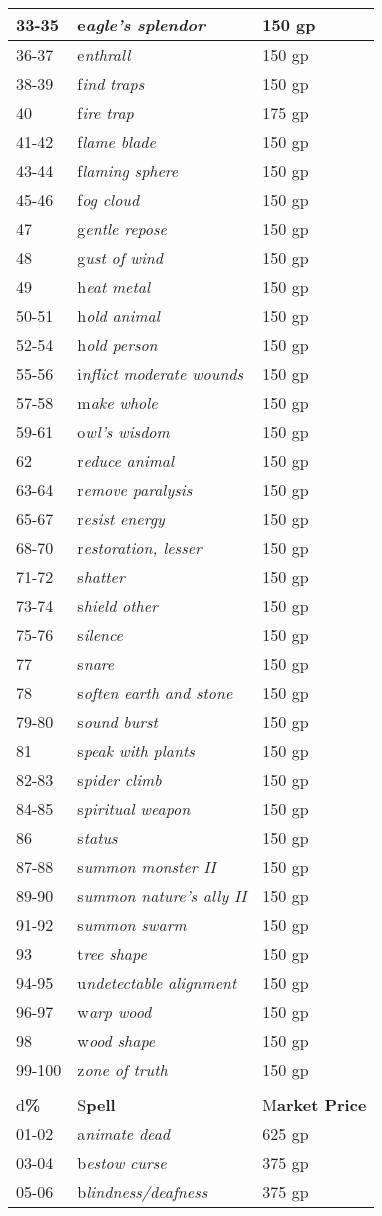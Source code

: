 \documentclass{article}
\begin{document}
\begin{tabular}{|>{\raggedright}p{29pt}|>{\raggedright}p{138pt}|>{\raggedright}p{147pt}|}
\hline
33-35 & e\textit{agle's splendor} & 150 gp\tabularnewline
\hline
36-37 & e\textit{nthrall} & 150 gp\tabularnewline
\hline
38-39 & f\textit{ind traps} & 150 gp\tabularnewline
\hline
40 & f\textit{ire trap} & 175 gp\tabularnewline
\hline
41-42 & f\textit{lame blade} & 150 gp\tabularnewline
\hline
43-44 & f\textit{laming sphere} & 150 gp\tabularnewline
\hline
45-46 & f\textit{og cloud} & 150 gp\tabularnewline
\hline
47 & g\textit{entle repose} & 150 gp\tabularnewline
\hline
48 & g\textit{ust of wind} & 150 gp\tabularnewline
\hline
49 & h\textit{eat metal} & 150 gp\tabularnewline
\hline
50-51 & h\textit{old animal} & 150 gp\tabularnewline
\hline
52-54 & h\textit{old person} & 150 gp\tabularnewline
\hline
55-56 & i\textit{nflict moderate wounds} & 150 gp\tabularnewline
\hline
57-58 & m\textit{ake whole} & 150 gp\tabularnewline
\hline
59-61 & o\textit{wl's wisdom} & 150 gp\tabularnewline
\hline
62 & r\textit{educe animal} & 150 gp\tabularnewline
\hline
63-64 & r\textit{emove paralysis} & 150 gp\tabularnewline
\hline
65-67 & r\textit{esist energy} & 150 gp\tabularnewline
\hline
68-70 & r\textit{estoration, lesser} & 150 gp\tabularnewline
\hline
71-72 & s\textit{hatter} & 150 gp\tabularnewline
\hline
73-74 & s\textit{hield other} & 150 gp\tabularnewline
\hline
75-76 & s\textit{ilence} & 150 gp\tabularnewline
\hline
77 & s\textit{nare} & 150 gp\tabularnewline
\hline
78 & s\textit{often earth and stone} & 150 gp\tabularnewline
\hline
79-80 & s\textit{ound burst} & 150 gp\tabularnewline
\hline
81 & s\textit{peak with plants} & 150 gp\tabularnewline
\hline
82-83 & s\textit{pider climb} & 150 gp\tabularnewline
\hline
84-85 & s\textit{piritual weapon} & 150 gp\tabularnewline
\hline
86 & s\textit{tatus} & 150 gp\tabularnewline
\hline
87-88 & s\textit{ummon monster II} & 150 gp\tabularnewline
\hline
89-90 & s\textit{ummon nature's ally II} & 150 gp\tabularnewline
\hline
91-92 & s\textit{ummon swarm} & 150 gp\tabularnewline
\hline
93 & t\textit{ree shape} & 150 gp\tabularnewline
\hline
94-95 & u\textit{ndetectable alignment} & 150 gp\tabularnewline
\hline
96-97 & w\textit{arp wood} & 150 gp\tabularnewline
\hline
98 & w\textit{ood shape} & 150 gp\tabularnewline
\hline
99-100 & z\textit{one of truth} & 150 gp\tabularnewline
\hline
\multicolumn{3}{|p{314pt}|}{3\textit{\textbf{rd-Level Divine Spells}}}\tabularnewline
\hline
d\textbf{\%} & S\textbf{pell} & M\textbf{arket Price}\tabularnewline
\hline
01-02 & a\textit{nimate dead} & 625 gp\tabularnewline
\hline
03-04 & b\textit{estow curse} & 375 gp\tabularnewline
\hline
05-06 & b\textit{lindness/deafness} & 375 gp\tabularnewline

\end{tabular}
\end{document}
